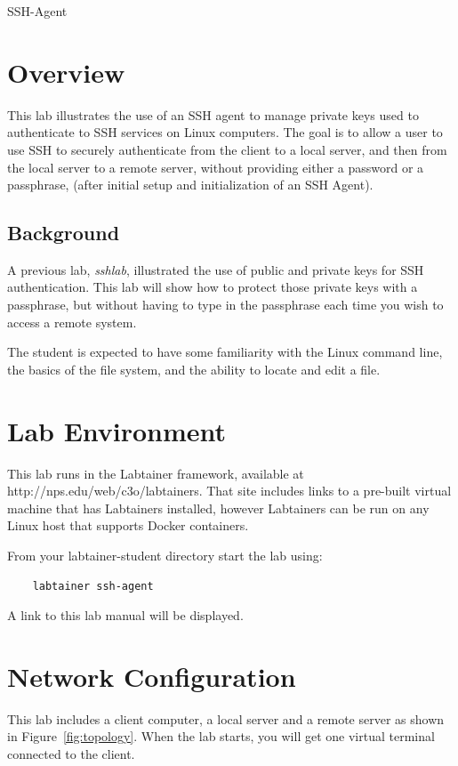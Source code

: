 


\begin{center}
{\LARGE SSH-Agent}
\vspace{0.1in}\\
\end{center}


\section{Overview}
This lab illustrates the use of an SSH agent to manage private keys used to
authenticate to SSH services on Linux computers.  The goal is to allow a user
to use SSH to securely authenticate from the client to a local server, and then from the
local server to a remote server, without providing either a password or a passphrase,
(after initial setup and initialization of an SSH Agent).

\subsection {Background}
A previous lab, \textit{sshlab},
illustrated the use of public and private keys for SSH authentication.  This lab
will show how to protect those private keys with a passphrase, but without having
to type in the passphrase each time you wish to access a remote system.

The student is expected to have some familiarity with the Linux command line,
the basics of the file system, and the ability to locate and edit a file.  

\section{Lab Environment}
This lab runs in the Labtainer framework,
available at http://nps.edu/web/c3o/labtainers.
That site includes links to a pre-built virtual machine
that has Labtainers installed, however Labtainers can
be run on any Linux host that supports Docker containers.

From your labtainer-student directory start the lab using:
\begin{verbatim}
    labtainer ssh-agent
\end{verbatim}
\noindent A link to this lab manual will be displayed.  


\section{Network Configuration}
This lab includes a client computer, a local server and
a remote server as shown in Figure~\ref{fig:topology}.
When the lab starts, you will get one virtual terminal connected 
to the client.


